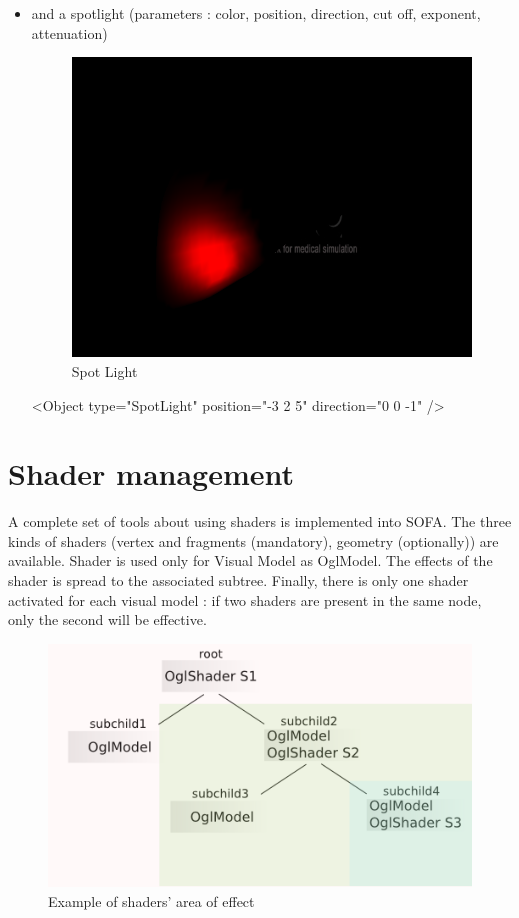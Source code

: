 \begin{itemize}
  \item and a spotlight (parameters : color, position, direction, cut off,
  exponent, attenuation)

	\begin{figure}[!h]
	\centering
	\includegraphics[width=0.33\linewidth]{images/light_spot.png}
	\caption{Spot Light}
	\end{figure}

	\begin{code_xml}
		<Object type="SpotLight" position="-3 2 5" direction="0 0 -1" />
	\end{code_xml}
\end{itemize}

\section{Shader management}
A complete set of tools about using shaders is implemented into SOFA. The three kinds of shaders (vertex and fragments (mandatory), geometry (optionally)) are available.
Shader is used only for Visual Model as OglModel.
\newline
The effects of the shader is spread to the associated subtree.
Finally, there is only one shader activated for each visual model : if two shaders are present in the same node, only the second will be effective.
\newpage
	\begin{figure}[!h]
	\centering
	\includegraphics[width=0.8\linewidth]{images/shader_tree.png}
	\caption{Example of shaders' area of effect}
	\end{figure}

